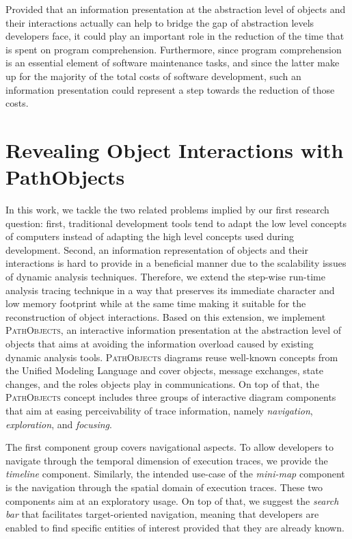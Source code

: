 Provided that an information presentation at the abstraction level of objects and their interactions actually can help to bridge the gap of abstraction levels developers face, it could play an important role in the reduction of the time that is spent on program comprehension.
Furthermore, since program comprehension is an essential element of software maintenance tasks, and since the latter make up for the majority of the total costs of software development,
such an information presentation could represent a step towards the reduction of those costs.


\section[Revealing Object Interactions with PathObjects]{Revealing Object Interactions with PathObjects%
}
In this work, we tackle the two related problems implied by our first research question: first, traditional development tools tend to adapt the low level concepts of computers instead of adapting the high level concepts used during development.
Second, an information representation of objects and their interactions is hard to provide in a beneficial manner due to the scalability issues of dynamic analysis techniques.
Therefore, we extend the step-wise run-time analysis tracing technique in a way that preserves its immediate character and low memory footprint while at the same time making it suitable for the reconstruction of object interactions.
Based on this extension, we implement \textsc{PathObjects}, an interactive information presentation at the abstraction level of objects that aims at avoiding the information overload caused by existing dynamic analysis tools.
\textsc{PathObjects} diagrams reuse well-known concepts from the Unified Modeling Language and cover objects, message exchanges, state changes, and the roles objects play in communications.
On top of that, the \textsc{PathObjects} concept includes three groups of interactive diagram components that aim at easing perceivability of trace information, namely \emph{navigation}, \emph{exploration}, and \emph{focusing}.

The first component group covers navigational aspects.
To allow developers to navigate through the temporal dimension of execution traces, we provide the \emph{timeline} component.
Similarly, the intended use-case of the \emph{mini-map} component is the navigation through the spatial domain of execution traces.
These two components aim at an exploratory usage.
On top of that, we suggest the \emph{search bar} that facilitates target-oriented navigation, meaning that developers are enabled to find specific entities of interest provided that they are already known.

